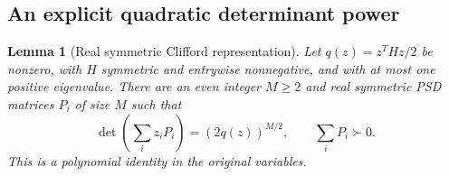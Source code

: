 \documentclass[11pt]{article}
\newtheorem{lemma}[theorem]{Lemma}
\theoremstyle{remark}
\begin{document}
\subsection{An explicit quadratic determinant power}

\begin{lemma}[Real symmetric Clifford representation]
\label{lem:clifford-power}
Let $q(z)=z^THz/2$ be nonzero, with $H$ symmetric and entrywise
nonnegative, and with at most one positive eigenvalue.
There are an even integer $M\ge2$ and real symmetric PSD matrices $P_i$
of size $M$ such that
\begin{equation}
 \det\left(\sum_i z_iP_i\right)=(2q(z))^{M/2},
 \qquad \sum_iP_i\succ0.
 \label{eq:quadratic-determinant-power}
\end{equation}
This is a polynomial identity in the original variables.
\end{lemma}
\end{document}
